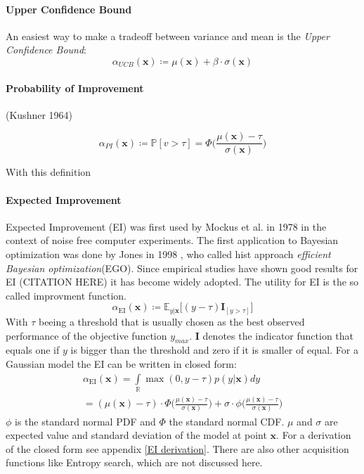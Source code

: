 \documentclass[english]{article}
\newcommand{\EI}{\operatorname{EI}}
\newcommand{\x}{\mathbf{x}}
\newcommand{\E}{\mathbb{E}}
\begin{document}
\paragraph{Upper Confidence Bound}
An easiest way to make a tradeoff between variance and mean is the \textit{Upper Confidence Bound}:
\begin{equation}
  \alpha_{UCB}(\x) \coloneqq \mu(\x) + \beta \cdot \sigma(\x)
\end{equation}

\paragraph{Probability of Improvement}

(Kushner 1964)

\begin{equation}
  \alpha_{PI}(\x) \coloneqq \mathbb{P}[v>\tau] = \Phi\bigg(\frac{\mu(\x)-\tau}{\sigma(\x)}\bigg)
\end{equation}

With this definition

\paragraph{Expected Improvement}
Expected Improvement (EI) was first used by Mockus et al. in 1978 \cite{mockus_application_1978} in the context of noise free computer experiments. The first application to Bayesian optimization was done by Jones in 1998 \cite{jones_efficient_1998}, who called hist approach \textit{efficient Bayesian optimization}(EGO). Since empirical studies have shown good results for EI (CITATION HERE) it has become widely adopted. The utility for EI is the so called improvment function.
\begin{equation}
  \alpha_{\EI}(\x) \coloneqq \E_{y|\x}\big[(y - \tau)\mathbf{I}_{[y > \tau]}\big]
\end{equation}
With $\tau$ beeing a threshold that is usually chosen as the best observed performance of the objective function $y_{max}$. $\mathbf{I}$ denotes the indicator function that equals one if $y$ is bigger than the threshold and zero if it is smaller of equal. For a Gaussian model the EI can be written in closed form:
\begin{equation}
  \begin{split}
    \alpha_{\EI}(\x) = \int\limits_{\mathbb{R}} \max(0, y-\tau)p(y|\x)dy
    \\
    = (\mu(\x) - \tau) \cdot \Phi \bigg(\frac{\mu(\x)-\tau}{\sigma(\x)}\bigg) + \sigma \cdot \phi \bigg(\frac{\mu(\x)-\tau}{\sigma(\x)}\bigg)
  \end{split}
\end{equation}
$\phi$ is the standard normal PDF and $\Phi$ the standard normal CDF. $\mu$ and $\sigma$ are expected value and standard deviation of the model at point $\x$.
For a derivation of the closed form see appendix \ref{EI derivation}.
There are also other acquisition functions like Entropy search, which are not discussed here.
\end{document}
